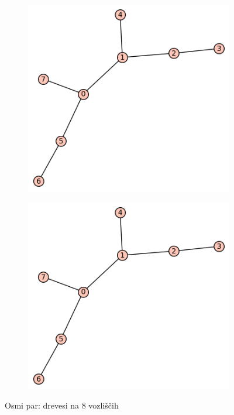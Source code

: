 \documentclass[12pt, a4paper]{article}
\begin{document}
\begin{figure}[!htb]
\centering
\begin{subfigure}{0.5\textwidth}
  \centering
  \includegraphics[width=0.5\linewidth]{t-30}
\end{subfigure}%
\begin{subfigure}{0.5\textwidth}
  \centering
  \includegraphics[width=0.5\linewidth]{t-30}
\end{subfigure}
\caption{Osmi par: drevesi na 8 vozliščih}
\label{fig:test}
\end{figure}
\end{document}
